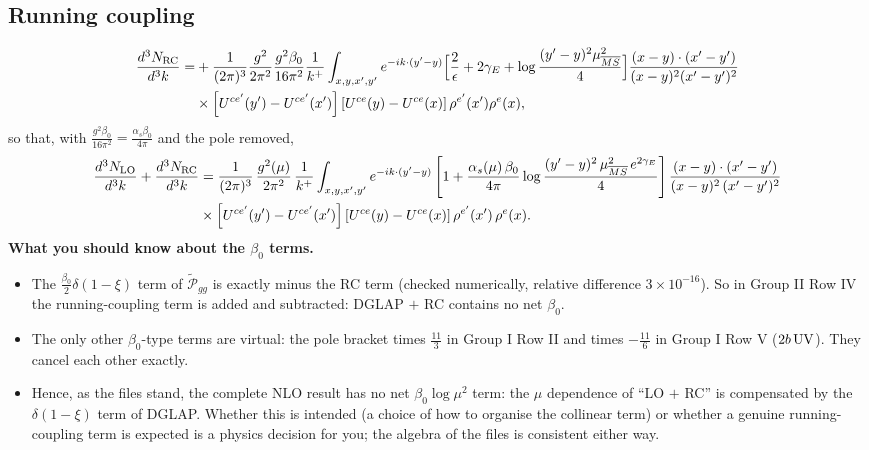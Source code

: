 \documentclass[9pt]{article}
\numberwithin{equation}{section}
\begin{document}
\subsection{Running coupling}
\begin{align}
\frac{d^{3}N_{\rm RC}}{d^{3}k}= & +\frac{1}{(2\pi)^{3}}\frac{g^{2}}{2\pi^{2}}\frac{g^{2}\beta_{0}}{16\pi^{2}}\frac{1}{k^{+}}\int_{x,y,x',y'}e^{-ik\cdot(y'-y)}\Big[\frac{2}{\epsilon}+2\gamma_{E}+\log\frac{(y'-y)^{2}\mu^{2}_{\overline{MS}}}{4}\Big]\frac{(x-y)\cdot(x'-y')}{(x-y)^{2}(x'-y')^{2}}\notag\\
&\times\left[U^{ce'}(y') - U^{ce'}(x')\right]\left[U^{ce}(y) - U^{ce}(x)\right]\rho^{e'}(x')\rho^{e}(x),
\end{align}
so that, with $\frac{g^{2}\beta_{0}}{16\pi^{2}}=\frac{\alpha_{s}\beta_{0}}{4\pi}$ and the pole removed,
\begin{align}
\frac{d^{3}N_{\rm LO}}{d^{3}k}+\frac{d^{3}N_{\rm RC}}{d^{3}k}&=\frac{1}{(2\pi)^{3}}\,\frac{g^{2}(\mu)}{2\pi^{2}}\,\frac{1}{k^{+}}\int_{x,y,x',y'}e^{-ik\cdot(y'-y)}\left[1+\frac{\alpha_{s}(\mu)\,\beta_{0}}{4\pi}\log\frac{(y'-y)^{2}\,\mu^{2}_{\overline{MS}}\,e^{2\gamma_{E}}}{4}\right]\frac{(x-y)\cdot(x'-y')}{(x-y)^{2}\,(x'-y')^{2}}\notag\\
&\times\left[U^{ce'}(y')-U^{ce'}(x')\right]\left[U^{ce}(y)-U^{ce}(x)\right]\rho^{e'}(x')\,\rho^{e}(x).
\end{align}
\textbf{What you should know about the $\beta_{0}$ terms.}
\begin{itemize}
\item The $\frac{\beta_{0}}{2}\delta(1-\xi)$ term of $\widetilde{\mathcal{P}}_{gg}$ is exactly minus the RC term (checked numerically, relative difference $3\times10^{-16}$). So in Group II Row IV the running-coupling term is added and subtracted: DGLAP $+$ RC contains no net $\beta_{0}$.
\item The only other $\beta_{0}$-type terms are virtual: the pole bracket times $\frac{11}{3}$ in Group I Row II and times $-\frac{11}{6}$ in Group I Row V ($2b\,{\rm UV}$). They cancel each other exactly.
\item Hence, as the files stand, the complete NLO result has no net $\beta_{0}\log\mu^{2}$ term: the $\mu$ dependence of ``LO $+$ RC'' is compensated by the $\delta(1-\xi)$ term of DGLAP. Whether this is intended (a choice of how to organise the collinear term) or whether a genuine running-coupling term is expected is a physics decision for you; the algebra of the files is consistent either way.
\end{itemize}
\end{document}
